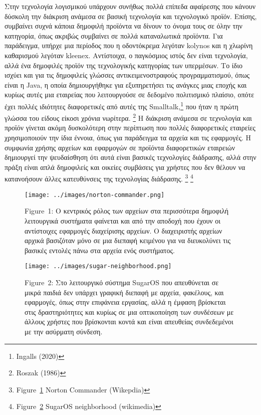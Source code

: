 \documentclass[
]{article}
\begin{document}
Στην τεχνολογία λογισμικού υπάρχουν συνήθως πολλά επίπεδα αφαίρεσης που
κάνουν δύσκολη την διάκριση ανάμεσα σε βασική τεχνολογία και τεχνολογικό
προϊόν. Επίσης, συμβαίνει συχνά κάποια δημοφιλή προϊόντα να δίνουν το
όνομα τους σε όλην την κατηγορία, όπως ακριβώς συμβαίνει σε πολλά
καταναλωτικά προϊόντα. Για παράδειγμα, υπήρχε μια περίοδος που η
οδοντόκρεμα λεγόταν kolynos και η χλωρίνη καθαρισμού λεγόταν kleenex.
Αντίστοιχα, ο παγκόσμιος ιστός δεν είναι τεχνολογία, αλλά ένα δημοφιλές
προϊόν της τεχνολογικής κατηγορίας των υπερμέσων. Το ίδιο ισχύει και για
τις δημοφιλείς γλώσσες αντικειμενοστραφούς προγραμματισμού, όπως είναι η
Java, η οποία δημιουργήθηκε για εξυπηρετήσει τις ανάγκες μιας εποχής και
κυρίως αυτές μια εταιρείας που λειτουργούσε σε δεδομένο πολιτισμικό
πλαίσιο, οπότε έχει πολλές ιδιότητες διαφορετικές από αυτές της
Smalltalk,\footnote{Ingalls (2020)} που ήταν η πρώτη γλώσσα του είδους
είκοσι χρόνια νωρίτερα. \footnote{Roszak (1986)} Η διάκριση ανάμεσα σε
τεχνολογία και προϊόν γίνεται ακόμη δυσκολότερη στην περίπτωση που
πολλές διαφορετικές εταιρείες χρησιμοποιούν την ίδια έννοια, όπως για
παράδειγμα τα αρχεία και τις εφαρμογές. Η συμφωνία χρήσης αρχείων και
εφαρμογών σε προϊόντα διαφορετικών εταιρειών δημιουργεί την ψευδαίσθηση
ότι αυτά είναι βασικές τεχνολογίες διάδρασης, αλλά στην πράξη είναι απλά
δημοφιλείς και οικείες συμβάσεις για χρήστες που δεν θέλουν να
κατανοήσουν άλλες κατευθύνσεις της τεχνολογίας διάδρασης. \footnote{Figure~\protect\hyperlink{fig:norton-commander}{1}
  Norton Commander (Wikepdia)} \footnote{Figure~\protect\hyperlink{fig:sugar-neighborhood}{2}
  SugarOS neighborhood (wikimedia)}

\leavevmode{}%
\begin{figure}
\hypertarget{fig:norton-commander}{%
\centering
\texttt{[image: ../images/norton-commander.png]}
\caption{Figure~1: Ο κεντρικός ρόλος των αρχείων στα περισσότερα
δημοφιλή λειτουργικά συστήματα φαίνεται και από την αποδοχή που έχουν οι
αντίστοιχες εφαρμογές διαχείρισης αρχείων. Ο διαχειριστής αρχείων αρχικά
βασιζόταν μόνο σε μια διεπαφή κειμένου για να διευκολύνει τις βασικές
εντολές πάνω στα αρχεία ενός συστήματος.}\label{fig:norton-commander}
}
\end{figure}

\leavevmode{}%
\begin{figure}
\hypertarget{fig:sugar-neighborhood}{%
\centering
\texttt{[image: ../images/sugar-neighborhood.png]}
\caption{Figure~2: Στο λειτουργικό σύστημα SugarOS που απευθύνεται σε
μικρά παιδιά δεν υπάρχει γραφική διεπαφή με αρχεία, φακέλους, και
εφαρμογές, όπως στην επιφάνεια εργασίας, αλλά η έμφαση βρίσκεται στις
δραστηριότητες και κυρίως σε μια οπτικοποίηση των συνδέσεων με άλλους
χρήστες που βρίσκονται κοντά και είναι απευθείας συνδεδεμένοι με την
ασύρματη σύνδεση.}\label{fig:sugar-neighborhood}
}
\end{figure}
\end{document}
